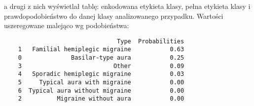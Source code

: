 a drugi z nich wyświetlał tablę: enkodowana etykieta klasy, pełna etykieta klasy i prawdopodobieństwo do danej klasy analizowanego przypadku. Wartości uszeregowane malejąco wg podobieństwa:

\begin{verbatim}
                                Type  Probabilities
    1   Familial hemiplegic migraine           0.63
    0              Basilar-type aura           0.25
    3                          Other           0.09
    4   Sporadic hemiplegic migraine           0.03
    5     Typical aura with migraine           0.00
    6  Typical aura without migraine           0.00
    2          Migraine without aura           0.00
\end{verbatim}